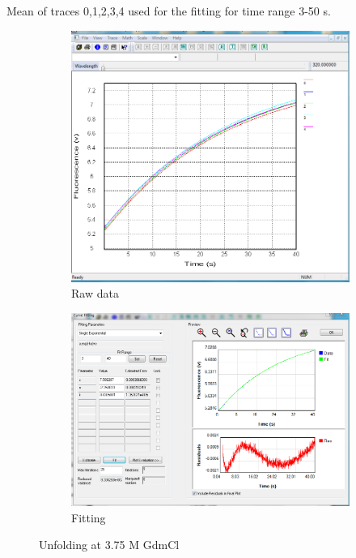 \documentclass[a4paper,english,12pt,bibliography=totoc]{scrreprt}
\begin{document}
Mean of traces 0,1,2,3,4 used for the fitting for time range 3-50 s.
\begin{figure}[H]
    \centering
    \begin{subfigure}[b]{0.45\textwidth}
        \centering
        \includegraphics[width=\textwidth]{Images/G8/uf4_raw.PNG}
        \caption{Raw data }
        \label{fig:sub1}
    \end{subfigure}
    \hspace{0cm} %
    \begin{subfigure}[b]{0.45\textwidth}
        \centering
        \includegraphics[width=\textwidth]{Images/G8/uf4_fitting.PNG}
        \caption{Fitting}
        \label{fig:sub2}
    \end{subfigure}
    \caption{Unfolding at 3.75 M GdmCl }
    \label{fig:main}
\end{figure}
\end{document}
